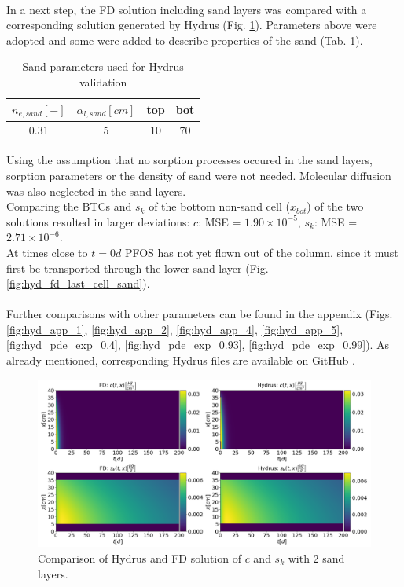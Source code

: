 \\
In a next step, the FD solution including sand layers was compared with a corresponding solution generated by Hydrus (Fig. \ref{fig:sol_ov_hyd_fd_sand}). Parameters above were adopted and some were added to describe properties of the sand (Tab. \ref{tab:sand_params}).
\begin{table}[h!]
    \centering
\begin{tabular}{cccc}
     $n_{e, sand} \left[-\right]$&$\alpha_{l, sand} \left[cm\right]$ & top & bot  \\ [0.2 cm] \hline
     0.31 & 5 & 10 & 70 \\
\end{tabular}
    \caption{Sand parameters used for Hydrus validation}
    \label{tab:sand_params}
\end{table}
Using the assumption that no sorption processes occured in the sand layers, sorption parameters or the density of sand were not needed. Molecular diffusion was also neglected in the sand layers.\\
Comparing the BTCs and $s_k$ of the bottom non-sand cell ($x_{bot}$) of the two solutions resulted in larger deviations: $c$: MSE = $1.90 \times 10^{-5}$, $s_k$: MSE = $2.71 \times 10^{-6}$.\\
At times close to $t=0d$ PFOS has not yet flown out of the column, since it must first be transported through the lower sand layer (Fig. \ref{fig:hyd_fd_last_cell_sand}).\\
\\
Further comparisons with other parameters can be found in the appendix (Figs. \ref{fig:hyd_app_1}, \ref{fig:hyd_app_2}, \ref{fig:hyd_app_4}, \ref{fig:hyd_app_5}, \ref{fig:hyd_pde_exp_0.4}, \ref{fig:hyd_pde_exp_0.93},  \ref{fig:hyd_pde_exp_0.99}). As already mentioned, corresponding Hydrus files are available on GitHub \cite{Hydrus_BA}.
\begin{figure}[h!]
	\centering
	\includegraphics[width=\textwidth]{images/sol_ov_hyd_fd_sand.png}
\caption[Comparison of Hydrus and FD solution with sand]{Comparison of Hydrus and FD solution of $c$ and $s_k$ with 2 sand layers.}
\label{fig:sol_ov_hyd_fd_sand}
\end{figure}
